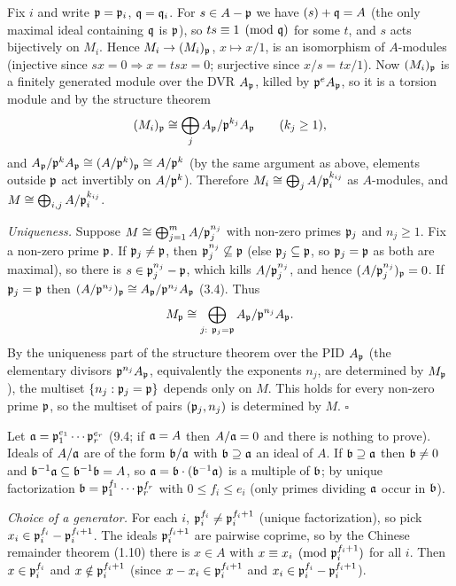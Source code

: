\documentclass[11pt]{article}
\begin{document}
Fix $i$ and write $\mathfrak p=\mathfrak p_i$, $\mathfrak q=\mathfrak q_i$. For $s\in A-\mathfrak p$ we have $(s)+\mathfrak q=A$ (the only maximal ideal containing $\mathfrak q$ is $\mathfrak p$), so $ts\equiv1\pmod{\mathfrak q}$ for some $t$, and $s$ acts bijectively on $M_i$. Hence $M_i\to(M_i)_\mathfrak p$, $x\mapsto x/1$, is an isomorphism of $A$-modules (injective since $sx=0\Rightarrow x=tsx=0$; surjective since $x/s=tx/1$). Now $(M_i)_\mathfrak p$ is a finitely generated module over the DVR $A_\mathfrak p$, killed by $\mathfrak p^{e}A_\mathfrak p$, so it is a torsion module and by the structure theorem
\[
(M_i)_\mathfrak p\cong\bigoplus_jA_\mathfrak p/\mathfrak p^{k_j}A_\mathfrak p\qquad(k_j\ge1),
\]
and $A_\mathfrak p/\mathfrak p^kA_\mathfrak p\cong(A/\mathfrak p^k)_\mathfrak p\cong A/\mathfrak p^k$ (by the same argument as above, elements outside $\mathfrak p$ act invertibly on $A/\mathfrak p^k$). Therefore $M_i\cong\bigoplus_jA/\mathfrak p_i^{k_{ij}}$ as $A$-modules, and $M\cong\bigoplus_{i,j}A/\mathfrak p_i^{k_{ij}}$.

\emph{Uniqueness.} Suppose $M\cong\bigoplus_{j=1}^mA/\mathfrak p_j^{n_j}$ with non-zero primes $\mathfrak p_j$ and $n_j\ge1$. Fix a non-zero prime $\mathfrak p$. If $\mathfrak p_j\ne\mathfrak p$, then $\mathfrak p_j^{n_j}\not\subseteq\mathfrak p$ (else $\mathfrak p_j\subseteq\mathfrak p$, so $\mathfrak p_j=\mathfrak p$ as both are maximal), so there is $s\in\mathfrak p_j^{n_j}-\mathfrak p$, which kills $A/\mathfrak p_j^{n_j}$, and hence $(A/\mathfrak p_j^{n_j})_\mathfrak p=0$. If $\mathfrak p_j=\mathfrak p$ then $(A/\mathfrak p^{n_j})_\mathfrak p\cong A_\mathfrak p/\mathfrak p^{n_j}A_\mathfrak p$ (3.4). Thus
\[
M_\fp\cong\bigoplus_{j:\ \fp_j=\fp}A_\fp/\fp^{n_j}A_\fp .
\]
By the uniqueness part of the structure theorem over the PID $A_\mathfrak p$ (the elementary divisors $\mathfrak p^{n_j}A_\mathfrak p$, equivalently the exponents $n_j$, are determined by $M_\mathfrak p$), the multiset $\{n_j:\mathfrak p_j=\mathfrak p\}$ depends only on $M$. This holds for every non-zero prime $\mathfrak p$, so the multiset of pairs $(\mathfrak p_j,n_j)$ is determined by $M$. \hfill$\square$

\pf
Let $\mathfrak a=\mathfrak p_1^{e_1}\cdots\mathfrak p_r^{e_r}$ (9.4; if $\mathfrak a=A$ then $A/\mathfrak a=0$ and there is nothing to prove). Ideals of $A/\mathfrak a$ are of the form $\mathfrak b/\mathfrak a$ with $\mathfrak b\supseteq\mathfrak a$ an ideal of $A$. If $\mathfrak b\supseteq\mathfrak a$ then $\mathfrak b\ne0$ and $\mathfrak b^{-1}\mathfrak a\subseteq\mathfrak b^{-1}\mathfrak b=A$, so $\mathfrak a=\mathfrak b\cdot(\mathfrak b^{-1}\mathfrak a)$ is a multiple of $\mathfrak b$; by unique factorization $\mathfrak b=\mathfrak p_1^{f_1}\cdots\mathfrak p_r^{f_r}$ with $0\le f_i\le e_i$ (only primes dividing $\mathfrak a$ occur in $\mathfrak b$).

\emph{Choice of a generator.} For each $i$, $\mathfrak p_i^{f_i}\ne\mathfrak p_i^{f_i+1}$ (unique factorization), so pick $x_i\in\mathfrak p_i^{f_i}-\mathfrak p_i^{f_i+1}$. The ideals $\mathfrak p_i^{f_i+1}$ are pairwise coprime, so by the Chinese remainder theorem (1.10) there is $x\in A$ with $x\equiv x_i\pmod{\mathfrak p_i^{f_i+1}}$ for all $i$. Then $x\in\mathfrak p_i^{f_i}$ and $x\notin\mathfrak p_i^{f_i+1}$ (since $x-x_i\in\mathfrak p_i^{f_i+1}$ and $x_i\in\mathfrak p_i^{f_i}-\mathfrak p_i^{f_i+1}$).
\end{document}
